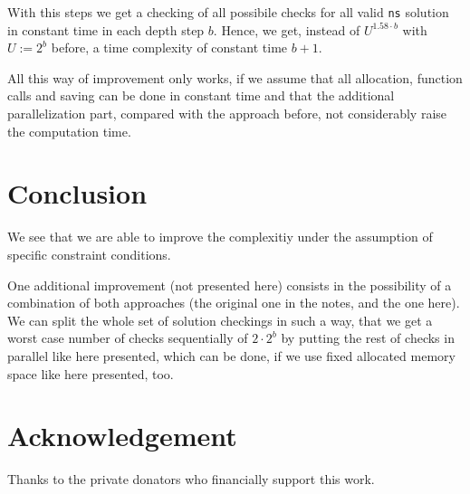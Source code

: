 \documentclass{article}
\newtheorem*{theorem A}{Theorem A}
\newtheorem*{theorem B}{N\"olker's Theorem}
\theoremstyle{remark}
\theoremstyle{remark}
\begin{document}
With this steps we get a checking of all possibile checks for all valid \texttt{ns} solution in constant time in each depth step $b$. Hence, we get, instead of $U^{1.58 \cdot b}$ with $U := 2^{b}$ before, a time complexity of constant time $b+1$.

All this way of improvement only works, if we assume that all allocation, function calls and saving can be done in constant time and that the additional parallelization part, compared with the approach before, not considerably raise the computation time.
\section*{Conclusion}
\label{s:conclusion}
We see that we are able to improve the complexitiy under the assumption of specific constraint conditions.

One additional improvement (not presented here) consists in the possibility of a combination of both approaches (the original one in the notes, and the one here). We can split the whole set of solution checkings in such a way, that we get a worst case number of checks sequentially of $2 \cdot 2^{b}$ by putting the rest of checks in parallel like here presented, which can be done, if we use fixed allocated memory space like here presented, too.
\section*{Acknowledgement}
\label{s:acknowledgement}
Thanks to the private donators who financially support this work.
\end{document}
